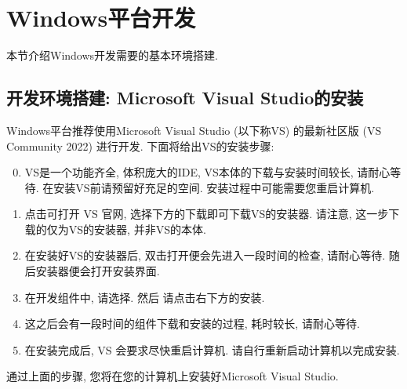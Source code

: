 
\section{Windows平台开发}\label{WindowsPlatform}
本节介绍Windows开发需要的基本环境搭建.
\subsection{开发环境搭建: Microsoft Visual Studio的安装}
Windows平台推荐使用Microsoft Visual Studio (以下称VS) 的最新社区版 (VS Community 2022) 进行开发. 下面将给出VS的安装步骤:

\begin{enumerate}
    \setcounter{enumi}{-1}
    \item VS是一个功能齐全, 体积庞大的IDE, VS本体的下载与安装时间较长, 请耐心等待. 在安装VS前请预留好充足的空间. 安装过程中可能需要您重启计算机.
    \item 点击可打开 VS 官网, 选择下方的下载即可下载VS的安装器.
          请注意, 这一步下载的仅为VS的安装器, 并非VS的本体.
    \item 在安装好VS的安装器后, 双击打开便会先进入一段时间的检查, 请耐心等待. 随后安装器便会打开安装界面.
    \item 在开发组件中, 请选择{}. 然后
    请点击右下方的安装.
    \item 这之后会有一段时间的组件下载和安装的过程, 耗时较长, 请耐心等待.
    \item 在安装完成后, VS 会要求尽快重启计算机. 请自行重新启动计算机以完成安装.
\end{enumerate}
通过上面的步骤, 您将在您的计算机上安装好Microsoft Visual Studio.

